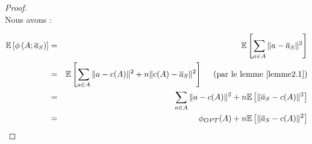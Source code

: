 \documentclass[12pt,a4paper]{book}
\newcommand{\E}{\mathbb{E}}
\newcommand{\1}{\mathds{1}}
\begin{document}
	\begin{proof}
		~\\
		Nous avons :
		
		\begin{eqnarray*}
			\E \left[ \phi\left(A;\overline{a}_S \right) \right] &=& \E \left[ \sum_{a \in A} \Vert a - \overline{a}_S \Vert^2 \right] \\
			&=& \E \left[ \sum_{a \in A} \Vert a - c(A) \Vert^2 + n \Vert c(A) - \overline{a}_S \Vert^2 \right] \quad \textrm{ (par le lemme \ref{lemme2.1})} \\
			&=& \sum_{a \in A} \Vert a - c(A) \Vert^2 + n \E \left[ \Vert \overline{a}_S - c(A) \Vert^2 \right] \\
			&=& \phi_{OPT}(A) + n \E \left[ \Vert \overline{a}_S - c(A) \Vert^2 \right]
		\end{eqnarray*}
		

\end{proof}
\end{document}
